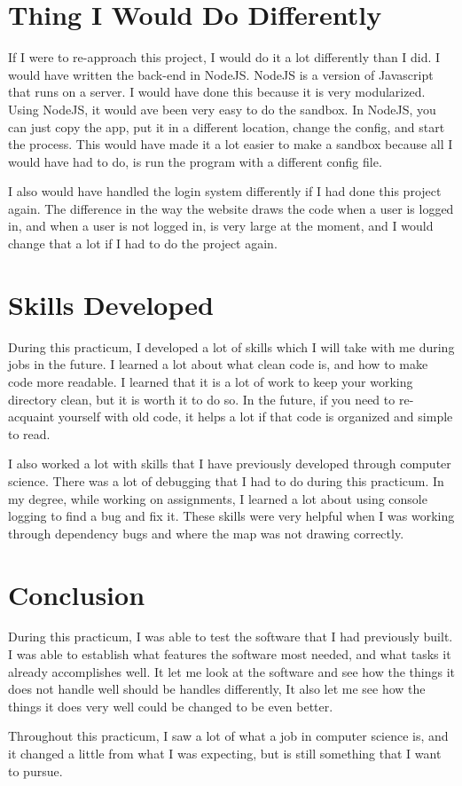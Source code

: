 \documentclass[12pt]{extarticle}
\begin{document}
\section{Thing I Would Do Differently}
	If I were to re-approach this project, I would do it a lot differently than I did.  I would have written the back-end in NodeJS.  NodeJS is a version of Javascript that runs on a server.  I would have done this because it is very modularized.  Using NodeJS, it would ave been very easy to do the sandbox.  In NodeJS, you can just copy the app, put it in a different location, change the config, and start the process.  This would have made it a lot easier to make a sandbox because all I would have had to do, is run the program with a different config file.

	I also would have handled the login system differently if I had done this project again.  The difference in the way the website draws the code when a user is logged in, and when a user is not logged in, is very large at the moment, and I would change that a lot if I had to do the project again.

\section{Skills Developed}
	During this practicum, I developed a lot of skills which I will take with me during jobs in the future.  I learned a lot about what clean code is, and how to make code more readable.  I learned that it is a lot of work to keep your working directory clean, but it is worth it to do so.  In the future, if you need to re-acquaint yourself with old code, it helps a lot if that code is organized and simple to read.

	I also worked a lot with skills that I have previously developed through computer science.  There was a lot of debugging that I had to do during this practicum.  In my degree, while working on assignments, I learned a lot about using console logging to find a bug and fix it.  These skills were very helpful when I was working through dependency bugs and where the map was not drawing correctly.

\section{Conclusion}
	During this practicum, I was able to test the software that I had previously built.  I was able to establish what features the software most needed, and what tasks it already accomplishes well.  It let me look at the software and see how the things it does not handle well should be handles differently, It also let me see how the things it does very well could be changed to be even better.

	Throughout this practicum, I saw a lot of what a job in computer science is, and it changed a little from what I was expecting, but is still something that I want to pursue.
\end{document}
